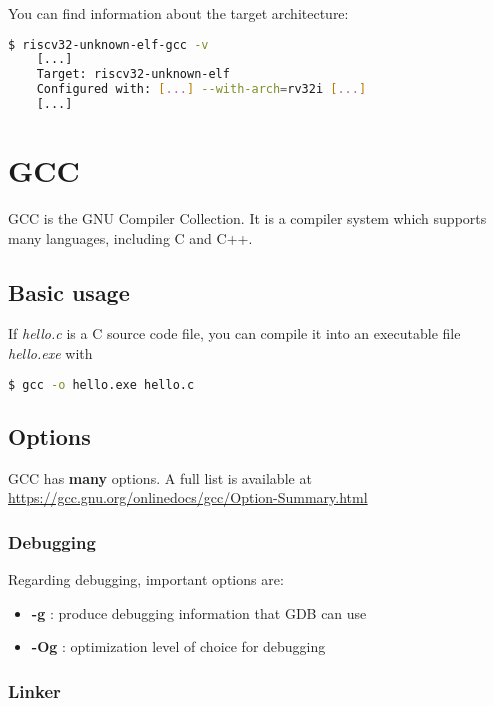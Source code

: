 \documentclass{article}
\begin{document}
    You can find information about the target architecture:
    
    \begin{lstlisting}[language=bash]
    $ riscv32-unknown-elf-gcc -v
    [...]
    Target: riscv32-unknown-elf
    Configured with: [...] --with-arch=rv32i [...]
    [...] 
    \end{lstlisting}
    
    \newpage
    \section{GCC}
    
    GCC is the GNU Compiler Collection. It is a compiler system which supports many languages, including C and C++.
    
    \subsection{Basic usage}
    
    If \textit{hello.c} is a C source code file, you can compile it into an executable file \textit{hello.exe} with
    
    \begin{lstlisting}[language=bash]
    $ gcc -o hello.exe hello.c
    \end{lstlisting}
    
    \subsection{Options}
    
    GCC has \textbf{many} options. A full list is available at \url{https://gcc.gnu.org/onlinedocs/gcc/Option-Summary.html}
    
	\subsubsection{Debugging}    
    
    Regarding debugging, important options are:
    
    \vspace{-\topsep}
	\begin{itemize}
	\item \textbf{-g} : produce debugging information that GDB can use
	\item \textbf{-Og} : optimization level of choice for debugging
	\end{itemize}
	
	
    \subsubsection{Linker}
    
\end{document}
